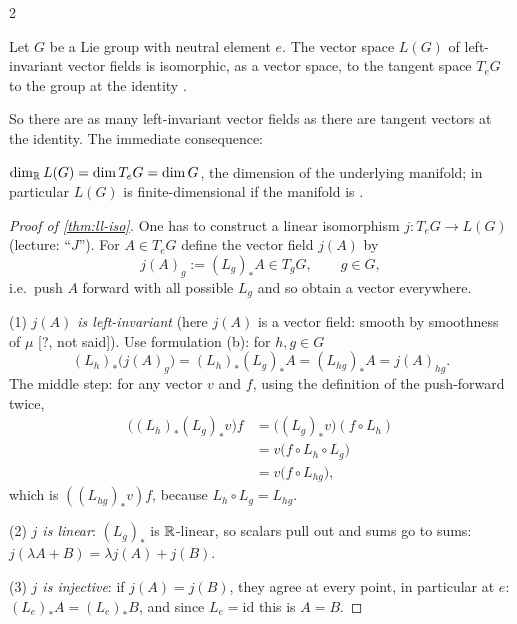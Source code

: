 \begin{paracol}{2}
\begin{theorem}[$L(G)\cong T_eG$]\label{thm:ll-iso}
Let $G$ be a Lie group with neutral element $e$. The vector space $L(G)$ of left-invariant vector fields is isomorphic, as a vector space, to the tangent space $T_eG$ to the group at the identity   .
\end{theorem}
So there are as many left-invariant vector fields as there are tangent vectors at the identity. The immediate consequence:
\begin{corollary}[Dimension]\label{cor:ll-dim}
$\dim_{\mathbb{R}}L(G)=\dim T_eG=\dim G$, the dimension of the underlying manifold; in particular $L(G)$ is finite-dimensional if the manifold is  .
\end{corollary}
\begin{proof}[Proof of \cref{thm:ll-iso}]
One has to construct a linear isomorphism $j\colon T_eG\to L(G)$ (lecture: ``$J$''). For $A\in T_eG$ define the vector field $j(A)$ by
\[
  j(A)_g:=(L_g)_*A\in T_gG,\qquad g\in G,
\]
i.e.\ push $A$ forward with all possible $L_g$ and so obtain a vector everywhere.      \par
(1) \emph{$j(A)$ is left-invariant} (here $j(A)$ is a vector field: smooth by smoothness of $\mu$ [?, not said]). Use formulation (b): for $h,g\in G$
\[
  (L_h)_*\bigl(j(A)_g\bigr)=(L_h)_*(L_g)_*A=(L_{hg})_*A=j(A)_{hg}.
\]
The middle step: for any vector $v$ and $f$, using the definition of the push-forward twice,
\[
  \begin{aligned}
  \bigl((L_h)_*(L_g)_*v\bigr)f&=\bigl((L_g)_*v\bigr)(f\circ L_h)\\
  &=v\bigl(f\circ L_h\circ L_g\bigr)\\
  &=v\bigl(f\circ L_{hg}\bigr),
  \end{aligned}
\]
which is $((L_{hg})_*v)f$, because $L_h\circ L_g=L_{hg}$.         \par
(2) \emph{$j$ is linear}: $(L_g)_*$ is $\mathbb{R}$-linear, so scalars pull out and sums go to sums: $j(\lambda A+B)=\lambda j(A)+j(B)$.    \par
(3) \emph{$j$ is injective}: if $j(A)=j(B)$, they agree at every point, in particular at $e$: $(L_e)_*A=(L_e)_*B$, and since $L_e=\mathrm{id}$ this is $A=B$.    \par

\end{proof}
\end{paracol}
